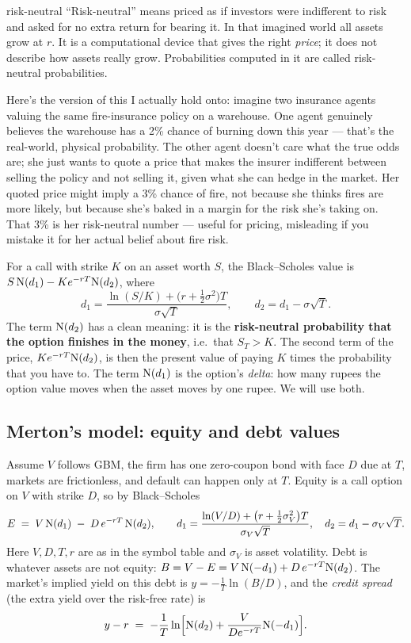\begin{defbox}{risk-neutral}
``Risk-neutral'' means priced as if investors were indifferent to risk and asked for no extra return for bearing it. In that imagined world all assets grow at $r$. It is a computational device that gives the right \emph{price}; it does not describe how assets really grow. Probabilities computed in it are called risk-neutral probabilities.

Here's the version of this I actually hold onto: imagine two insurance agents valuing the same fire-insurance policy on a warehouse. One agent genuinely believes the warehouse has a 2\% chance of burning down this year — that's the real-world, physical probability. The other agent doesn't care what the true odds are; she just wants to quote a price that makes the insurer indifferent between selling the policy and not selling it, given what she can hedge in the market. Her quoted price might imply a 3\% chance of fire, not because she thinks fires are more likely, but because she's baked in a margin for the risk she's taking on. That 3\% is her risk-neutral number — useful for pricing, misleading if you mistake it for her actual belief about fire risk.
\end{defbox}

For a call with strike $K$ on an asset worth $S$, the Black--Scholes value is $S\,\mathrm{N}(d_1)-Ke^{-rT}\mathrm{N}(d_2)$, where
\[
d_1=\frac{\ln(S/K)+\big(r+\tfrac12\sigma^2\big)T}{\sigma\sqrt T},\qquad d_2=d_1-\sigma\sqrt T .
\]
The term $\mathrm{N}(d_2)$ has a clean meaning: it is the \textbf{risk-neutral probability that the option finishes in the money}, i.e.\ that $S_T>K$. The second term of the price, $Ke^{-rT}\mathrm{N}(d_2)$, is then the present value of paying $K$ times the probability that you have to. The term $\mathrm{N}(d_1)$ is the option's \emph{delta}: how many rupees the option value moves when the asset moves by one rupee. We will use both.

\subsection{Merton's model: equity and debt values}
Assume $V$ follows GBM, the firm has one zero-coupon bond with face $D$ due at $T$, markets are frictionless, and default can happen only at $T$. Equity is a call option on $V$ with strike $D$, so by Black--Scholes
\begin{equation}
E \;=\; V\,\mathrm{N}(d_1)\;-\;D\,e^{-rT}\,\mathrm{N}(d_2),\qquad
d_1=\frac{\ln(V/D)+\big(r+\tfrac12\sigma_V^2\big)T}{\sigma_V\sqrt T},\quad d_2=d_1-\sigma_V\sqrt T .
\label{eq:equity}
\end{equation}
Here $V,D,T,r$ are as in the symbol table and $\sigma_V$ is asset volatility. Debt is whatever assets are not equity: $B=V-E=V\,\mathrm{N}(-d_1)+D\,e^{-rT}\mathrm{N}(d_2)$. The market's implied yield on this debt is $y=-\tfrac1T\ln(B/D)$, and the \emph{credit spread} (the extra yield over the risk-free rate) is
\begin{equation}
y-r \;=\; -\frac1T\ln\!\Big[\mathrm{N}(d_2)+\frac{V}{De^{-rT}}\mathrm{N}(-d_1)\Big].
\end{equation}

